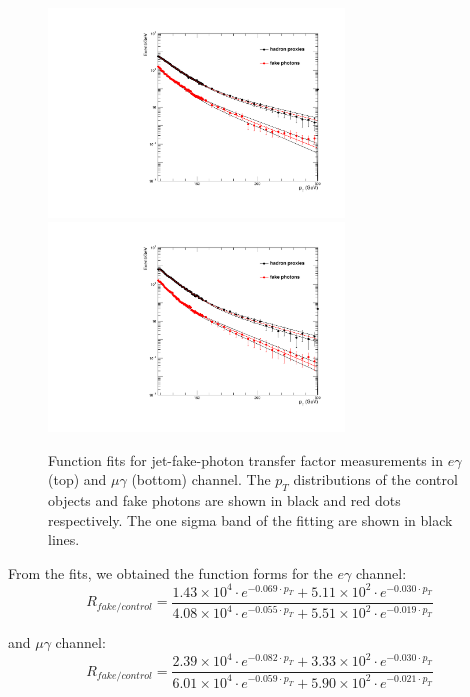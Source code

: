 \documentclass[thesis.tex]{subfiles}
\renewcommand\_{\textunderscore\allowbreak}
\begin{document}
\begin{figure}[hbtp]
  \centering
    \includegraphics[width=0.7\textwidth]{Figures/JetFakeRate_transfer_eg_EB.pdf} \\
    \includegraphics[width=0.7\textwidth]{Figures/JetFakeRate_transfer_mg_EB.pdf}
  \caption{Function fits for jet-fake-photon transfer factor measurements in $e\gamma$ (top) and $\mu\gamma$ (bottom) channel. The $p_T$ distributions of the control objects and fake photons are shown in black and red dots respectively. The one sigma band of the fitting are shown in black lines.}
    \label{fig:jetFakePt}
\end{figure}

From the fits, we obtained the function forms for the $e\gamma$ channel:
\begin{equation}
R_{fake/control} = \frac{ 1.43 \times 10^4 \cdot e^{-0.069 \cdot p_T} + 5.11 \times 10^2 \cdot e^{-0.030 \cdot p_T}}{4.08 \times 10^4 \cdot e^{-0.055 \cdot p_T} +  5.51 \times 10^2 \cdot e^{-0.019 \cdot p_T}}
\end{equation}

and $\mu\gamma$ channel:
\begin{equation}
R_{fake/control} = \frac{ 2.39 \times 10^4 \cdot e^{-0.082 \cdot p_T} + 3.33 \times 10^2 \cdot e^{-0.030 \cdot p_T}}{6.01 \times 10^4 \cdot e^{-0.059 \cdot p_T} +  5.90 \times 10^2 \cdot e^{-0.021 \cdot p_T}}
\end{equation}
\end{document}
